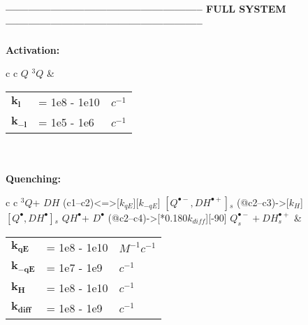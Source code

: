 \documentclass{article}
\def\IRP{$\left[Q^{\bullet -},DH^{\bullet +}\right]{}_s$}
\def\QH{$QH^{\bullet }$}
\def\D{$D^{\bullet }$}
\def\Q{$Q$}
\def\Qt{$^{3}Q$}
\def\DH{$DH$}
\begin{document}


\vspace{1.5mm}
\vspace{1.5mm}

\textbf{----------------------------------------------------- FULL SYSTEM -----------------------------------------------------}
\\
\\

\textbf{Activation:}
\begin{tabular}{ c c }
    \schemestart
    \Q
    \arrow{<=>[$h\nu$, $k_l$][$k_{-l}$]}
    \Qt
    \schemestop
     & \begin{tabular}{ l l l }
           $\mathbf{k_l}$    & = 1e8 - 1e10 & $c^{-1}$ \\
           $\mathbf{k_{-l}}$ & = 1e5  - 1e6 & $c^{-1}$ \\\hline
       \end{tabular}
    \vspace{1.5mm}
\end{tabular}
\vspace{1.5mm}
\\
\\
\textbf{Quenching:}

\begin{tabular}{ c c }
    \schemestart
    \Qt + \DH
    \arrow(c1--c2){<=>[$k_{qE}$][$k_{-qE}$]}
    \IRP
    \arrow(@c2--c3){->[$k_H$]}
    $\left[Q^{\bullet},DH^{\bullet}\right]{}_s$
    \arrow{->[$k_{diff}$]}
    \QH + \D
    \arrow(@c2--c4){->[*{0.180}$k_{diff}$]}[-90]
    $Q_s^{\bullet -} + DH_s^{\bullet +}$
    \schemestop
     & \begin{tabular}{ l l l }
           $\mathbf{k_{qE}}$   & = 1e8 - 1e10 & $M^{-1}c^{-1}$ \\
           $\mathbf{k_{-qE}}$  & = 1e7 - 1e9  & $c^{-1}$       \\
           $\mathbf{k_H}$      & = 1e8 - 1e10 & $c^{-1}$       \\
           $\mathbf{k_{diff}}$ & = 1e8 - 1e9  & $c^{-1}$       \\\hline
       \end{tabular}
    \vspace{1.5mm}
    \\
\end{tabular}
\vspace{1.5mm}
\end{document}
